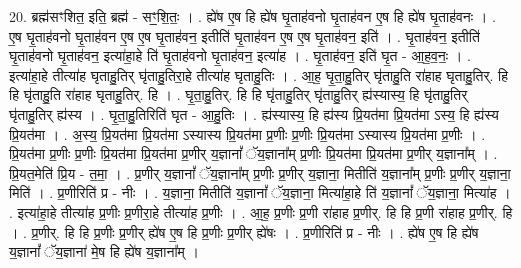 \documentclass[17pt]{extarticle}
\begin{document}
20. ब्रह्म॑सꣳशित॒ इति॒ ब्रह्म॑ - सꣳ॒॒शि॒तः॒ । . ह्ये॑ष ए॒ष हि ह्ये॑ष घृ॒ताह॑वनो घृ॒ताह॑वन ए॒ष हि ह्ये॑ष घृ॒ताह॑वनः । . ए॒ष घृ॒ताह॑वनो घृ॒ताह॑वन ए॒ष ए॒ष घृ॒ताह॑वन॒ इतीति॑ घृ॒ताह॑वन ए॒ष ए॒ष घृ॒ताह॑वन॒ इति॑ । . घृ॒ताह॑वन॒ इतीति॑ घृ॒ताह॑वनो घृ॒ताह॑वन॒ इत्या॑हा॒हे ति॑ घृ॒ताह॑वनो घृ॒ताह॑वन॒ इत्या॑ह । . घृ॒ताह॑वन॒ इति॑ घृ॒त - आ॒ह॒व॒नः॒ । . इत्या॑हा॒हे तीत्या॑ह घृताहु॒तिर् घृ॑ताहु॒तिरा॒हे तीत्या॑ह घृताहु॒तिः । . आ॒ह॒ घृ॒ता॒हु॒तिर् घृ॑ताहु॒ति रा॑हाह घृताहु॒तिर्. हि हि घृ॑ताहु॒ति रा॑हाह घृताहु॒तिर्. हि । . घृ॒ता॒हु॒तिर्. हि हि घृ॑ताहु॒तिर् घृ॑ताहु॒तिर् ह्य॑स्यास्य॒ हि घृ॑ताहु॒तिर् घृ॑ताहु॒तिर् ह्य॑स्य । . घृ॒ता॒हु॒तिरिति॑ घृत - आ॒हु॒तिः । . ह्य॑स्यास्य॒ हि ह्य॑स्य प्रि॒यत॑मा प्रि॒यत॑मा ऽस्य॒ हि ह्य॑स्य प्रि॒यत॑मा । . अ॒स्य॒ प्रि॒यत॑मा प्रि॒यत॑मा ऽस्यास्य प्रि॒यत॑मा प्र॒णीः प्र॒णीः प्रि॒यत॑मा ऽस्यास्य प्रि॒यत॑मा प्र॒णीः । . प्रि॒यत॑मा प्र॒णीः प्र॒णीः प्रि॒यत॑मा प्रि॒यत॑मा प्र॒णीर् य॒ज्ञानां᳚ ॅय॒ज्ञाना᳚म् प्र॒णीः प्रि॒यत॑मा प्रि॒यत॑मा प्र॒णीर् य॒ज्ञाना᳚म् । . प्रि॒यत॒मेति॑ प्रि॒य - त॒मा॒ । . प्र॒णीर् य॒ज्ञानां᳚ ॅय॒ज्ञाना᳚म् प्र॒णीः प्र॒णीर् य॒ज्ञाना॒ मितीति॑ य॒ज्ञाना᳚म् प्र॒णीः प्र॒णीर् य॒ज्ञाना॒ मिति॑ । . प्र॒णीरिति॑ प्र - नीः । . य॒ज्ञाना॒ मितीति॑ य॒ज्ञानां᳚ ॅय॒ज्ञाना॒ मित्या॑हा॒हे ति॑ य॒ज्ञानां᳚ ॅय॒ज्ञाना॒ मित्या॑ह । . इत्या॑हा॒हे तीत्या॑ह प्र॒णीः प्र॒णीरा॒हे तीत्या॑ह प्र॒णीः । . आ॒ह॒ प्र॒णीः प्र॒णी रा॑हाह प्र॒णीर्. हि हि प्र॒णी रा॑हाह प्र॒णीर्. हि । . प्र॒णीर्. हि हि प्र॒णीः प्र॒णीर् ह्ये॑ष ए॒ष हि प्र॒णीः प्र॒णीर् ह्ये॑षः । . प्र॒णीरिति॑ प्र - नीः । . ह्ये॑ष ए॒ष हि ह्ये॑ष य॒ज्ञानां᳚ ॅय॒ज्ञाना॑ मे॒ष हि ह्ये॑ष य॒ज्ञाना᳚म् । \newline
\end{document}
